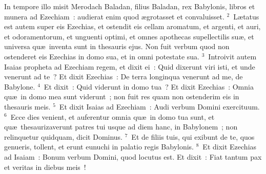 \lettrine[lines=3,image=true,loversize=0.05,lraise=-0.03]{I}{}n tempore illo misit Merodach Baladan, filius Baladan, rex Babylonis, libros et munera ad Ezechiam~: audierat enim quod \ae grotasset et convaluisset.
${}^{2}$~L\ae tatus est autem super eis Ezechias, et ostendit eis cellam aromatum, et argenti, et auri, et odoramentorum, et unguenti optimi, et omnes apothecas supellectilis su\ae , et universa qu\ae\ inventa sunt in thesauris ejus. Non fuit verbum quod non ostenderet eis Ezechias in domo sua, et in omni potestate sua.
${}^{3}$~Introivit autem Isaias propheta ad Ezechiam regem, et dixit ei~: Quid dixerunt viri isti, et unde venerunt ad te~? Et dixit Ezechias~: De terra longinqua venerunt ad me, de Babylone.
${}^{4}$~Et dixit~: Quid viderunt in domo tua~? Et dixit Ezechias~: Omnia qu\ae\ in domo mea sunt viderunt~; non fuit res quam non ostenderim eis in thesauris meis.
${}^{5}$~Et dixit Isaias ad Ezechiam~: Audi verbum Domini exercituum.
${}^{6}$~Ecce dies venient, et auferentur omnia qu\ae\ in domo tua sunt, et qu\ae\ thesaurizaverunt patres tui usque ad diem hanc, in Babylonem~; non relinquetur quidquam, dicit Dominus.
${}^{7}$~Et de filiis tuis, qui exibunt de te, quos genueris, tollent, et erunt eunuchi in palatio regis Babylonis.
${}^{8}$~Et dixit Ezechias ad Isaiam~: Bonum verbum Domini, quod locutus est. Et dixit~: Fiat tantum pax et veritas in diebus meis~!
